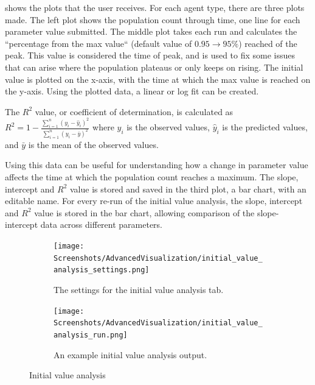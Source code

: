  shows the plots that the user receives.
For each agent type, there are three plots made.
The left plot shows the population count through time, one line for each parameter value submitted.
The middle plot takes each run and calculates the “percentage from the max value“ (default value of $0.95 \rightarrow 95\%$) reached of the peak.
This value is considered the time of peak, and is used to fix some issues that can arise where the population plateaus or only keeps on rising.
The initial value is plotted on the x-axis, with the time at which the max value is reached on the y-axis.
Using the plotted data, a linear or log fit can be created.

The $R^2$ value, or coefficient of determination, is calculated as $R^2 = 1 - \frac{\sum_{i=1}^n (y_i - \hat{y}_i)^2}{\sum_{i=1}^n (y_i - \bar{y})^2}$
where $y_i$ is the observed values, $\hat{y}_i$ is the predicted values, and $\bar{y}$ is the mean of the observed values.

Using this data can be useful for understanding how a change in parameter value affects the time at which the population count reaches a maximum.
The slope, intercept and $R^2$ value is stored and saved in the third plot, a bar chart, with an editable name.
For every re-run of the initial value analysis, the slope, intercept and $R^2$ value is stored in the bar chart, allowing comparison of the slope-intercept data across different parameters. 

\begin{figure}[!ht]
    \centering
    \begin{subfigure}{0.49\linewidth}
        \centering
        \captionsetup{width=1\linewidth}
        \texttt{[image: Screenshots/AdvancedVisualization/initial\_value\_analysis\_settings.png]}
        \caption{
            The settings for the initial value analysis tab. 
        }
        \label{fig:ss:av:initial_value_analysis_settings}
        \vspace*{\fill}
    \end{subfigure}
    \hfill
    \begin{subfigure}{0.49\linewidth}
        \centering
        \captionsetup{width=1\linewidth}
        \texttt{[image: Screenshots/AdvancedVisualization/initial\_value\_analysis\_run.png]}
        \caption{
            An example initial value analysis output. 
        }
        \label{fig:ss:av:initial_value_analysis_run}
        \vspace*{\fill}
    \end{subfigure}
    \caption{Initial value analysis}
\end{figure}

